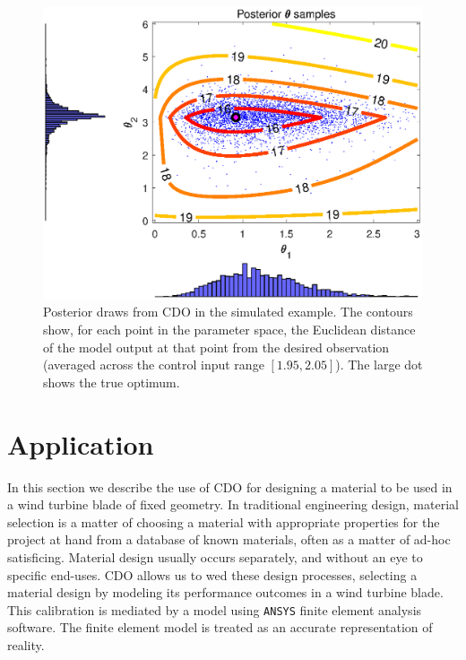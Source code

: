 \documentclass[12pt]{article}
\begin{document}
\begin{figure}
\centering
\includegraphics[scale=.8]{FIG_post_theta_contour_desobs0_lambdadelta1}
\caption{Posterior draws from CDO in the simulated example. The contours show, for each point in the parameter space, the Euclidean distance of the model output at that point from the desired observation (averaged across the control input range $[1.95,2.05]$). The large dot shows the true optimum.}
\label{fig:toy_sim_results}
\end{figure}



\section{Application}\label{application}

In this section we describe the use of CDO for designing a material to be used in a wind turbine blade of fixed geometry. 
%
In traditional engineering design, material selection is a matter of choosing a material with appropriate properties for the project at hand from a database of known materials, often as a matter of ad-hoc satisficing. 
%
Material design usually occurs separately, and without an eye to specific end-uses. 
%
CDO allows us to wed these design processes, selecting a material design by modeling its performance outcomes in a wind turbine blade.
%
%
This calibration is mediated by a model using \texttt{ANSYS} finite element analysis software. 
%
The finite element model is treated as an accurate representation of reality. %
\end{document}
